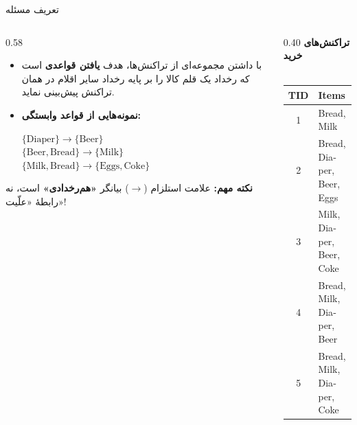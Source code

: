 \begin{frame}{تعریف مسئله}{}
\begin{columns}[T,onlytextwidth]
\begin{column}{0.58\textwidth}
\begin{itemize}\setlength{\itemsep}{5pt}
    \item با داشتن مجموعه‌ای از تراکنش‌ها، هدف \textbf{یافتن قواعدی} است که رخداد یک قلم کالا را بر پایه رخداد سایر اقلام در همان تراکنش پیش‌بینی نماید.
    \item \textbf{نمونه‌هایی از قواعد وابستگی:}
    \begin{center}
    \begin{latin}
    \small
    $\{\text{Diaper}\} \to \{\text{Beer}\}$ \\[2pt]
    $\{\text{Beer}, \text{Bread}\} \to \{\text{Milk}\}$ \\[2pt]
    $\{\text{Milk}, \text{Bread}\} \to \{\text{Eggs}, \text{Coke}\}$
    \end{latin}
    \end{center}
\end{itemize}

\vspace{0.15cm}
\begin{tcolorbox}[colback=mannheimblue!8,colframe=mannheimblue,arc=2pt,left=4pt,right=4pt,top=4pt,bottom=4pt]
\centering
\small \textbf{نکته مهم:} علامت استلزام ($\to$) بیانگر \textbf{«هم‌رخدادی»} است، نه رابطهٔ «علّیت»!\\[1pt]
{\scriptsize{}}
\end{tcolorbox}
\end{column}%
\begin{column}{0.40\textwidth}
\centering
\textbf{\small تراکنش‌های خرید}\\[1pt]
{\scriptsize{}}\\[3pt]
\begin{latin}
\fontsize{7.5}{9.5}\selectfont
\begin{tabular}{|c|l|}
\hline
\rowcolor{mannheimblue!15}
\textbf{TID} & \textbf{Items} \\ \hline
1 & Bread, Milk \\ \hline
2 & Bread, Diaper, Beer, Eggs \\ \hline
3 & Milk, Diaper, Beer, Coke \\ \hline
4 & Bread, Milk, Diaper, Beer \\ \hline
5 & Bread, Milk, Diaper, Coke \\ \hline
\end{tabular}
\end{latin}
\end{column}
\end{columns}
\end{frame}

